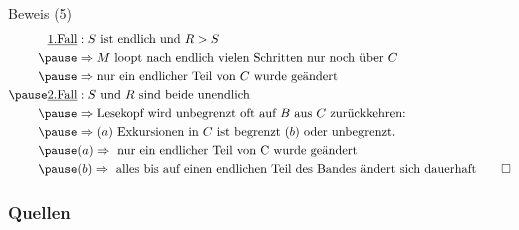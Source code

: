 \documentclass[aspectratio=169]{beamer}
\begin{document}
\begin{frame}{Beweis (5)}
\begin{align*}
\underline{\text{1.Fall}}&:  S \text{ ist endlich und } R > S \\ \pause
& \Rightarrow M \text{ loopt nach endlich vielen Schritten nur noch über } C\\ \pause
& \Rightarrow \text{nur ein endlicher Teil von } C \text{ wurde geändert} \\ \pause
\underline{\text{2.Fall}}&: S \text{ und } R \text{ sind beide unendlich} \\ \pause
& \Rightarrow \text{Lesekopf wird unbegrenzt oft auf } B \text{ aus } C \text{ zurückkehren:} \\ \pause
& \Rightarrow (a) \text{ Exkursionen in } C \text{ ist begrenzt } (b) \text{ oder unbegrenzt.}\\ \pause
& (a) \Rightarrow \text{ nur ein endlicher Teil von C wurde geändert}\\ \pause
& (b) \Rightarrow \text{ alles bis auf einen endlichen Teil des Bandes ändert sich dauerhaft} \qed
\end{align*}
\end{frame}

\begin{frame}
        \frametitle{Quellen}

        
\end{frame}
\end{document}
